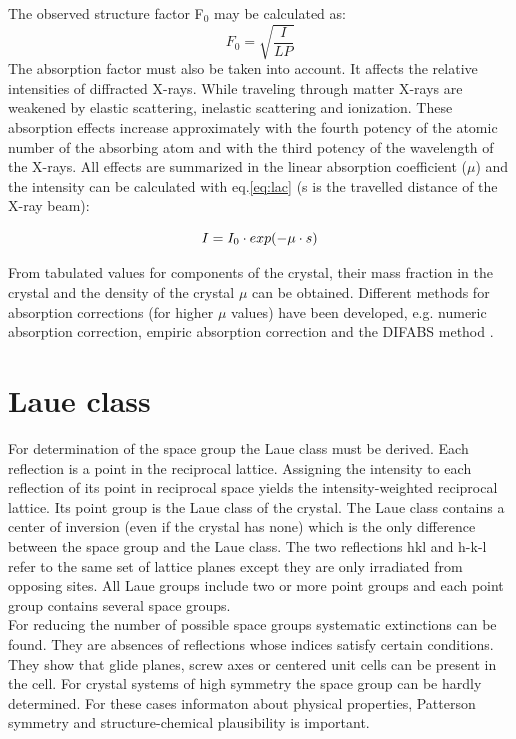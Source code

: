 The observed structure factor F$_0$ may be calculated as:
\begin{equation}
F_0=\sqrt {\frac{I}{LP}}
\end{equation}
 The absorption factor must also be taken into account. It affects the relative intensities of diffracted X-rays. While traveling through matter X-rays are weakened by elastic scattering, inelastic scattering and ionization. These absorption effects increase approximately with the fourth potency of the atomic number of the absorbing atom and with the third potency of the wavelength of the X-rays. All effects are summarized in the linear absorption coefficient ($\mu$) and the intensity can be calculated with eq.\ref{eq:lac} (s is the travelled distance of the X-ray beam):

\begin{equation}
I = I_0\cdot exp(-\mu\cdot s)\\
\label{eq:lac}
\end{equation}

From tabulated values for components of the crystal, their mass fraction in the crystal and the density of the crystal $\mu$ can be obtained. Different methods for absorption corrections (for higher $\mu$ values) have been developed, e.g. numeric absorption correction, empiric absorption correction and the DIFABS method \cite{wal83}.

\section{Laue class}
For determination of the space group the Laue class must be derived. Each reflection is a point in the reciprocal lattice. Assigning the intensity to each reflection of its point in reciprocal space yields the intensity-weighted reciprocal lattice. Its point group is the Laue class of the crystal. The Laue class contains a center of inversion (even if the crystal has none) which is the only difference between the space group and the Laue class. The two reflections hkl and h-k-l refer to the same set of lattice planes except they are only irradiated from opposing sites. All Laue groups include two or more point groups and each point group contains several space groups. \\
For reducing the number of possible space groups systematic extinctions can be found. They are absences of reflections whose indices satisfy certain conditions. They show that glide planes, screw axes or centered unit cells can be present in the cell. For crystal systems of high symmetry the space group can be hardly determined. For these cases informaton about physical properties, Patterson symmetry and structure-chemical plausibility is important.  



